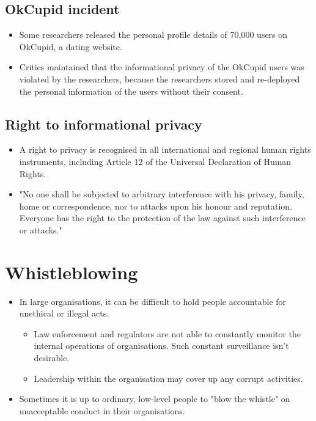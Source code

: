 \documentclass[11pt]{article}
\begin{document}
\subsection{OkCupid incident}
\label{sec:orgf362010}
\begin{itemize}
\item Some researchers released the personal profile details of 70,000 users on OkCupid, a dating website.
\item Critics maintained that the informational privacy of the OkCupid users was violated by the researchers, because the researchers stored and re-deployed the personal information of the users without their consent.
\end{itemize}
\subsection{Right to informational privacy}
\label{sec:org0a7f24c}
\begin{itemize}
\item A right to privacy is recognised in all international and regional human rights instruments, including Article 12 of the Universal Declaration of Human Rights.
\item "No one shall be subjected to arbitrary interference with his privacy, family, home or correspondence, nor to attacks upon his honour and reputation. Everyone has the right to the protection of the law against such interference or attacks."
\end{itemize}
\section{Whistleblowing}
\label{sec:org395e196}
\begin{itemize}
\item In large organisations, it can be difficult to hold people accountable for unethical or illegal acts.
\begin{itemize}
\item Law enforcement and regulators are not able to constantly monitor the internal operations of organisations. Such constant surveillance isn't desirable.
\item Leadership within the organisation may cover up any corrupt activities.
\end{itemize}
\item Sometimes it is up to ordinary, low-level people to "blow the whistle" on unacceptable conduct in their organisations.
\end{itemize}
\end{document}
